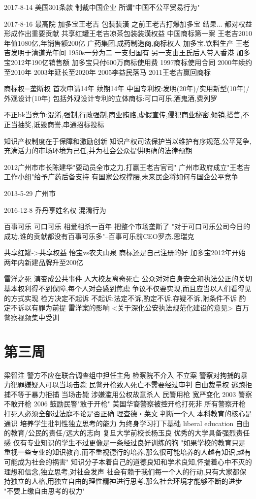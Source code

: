 \documentclass{article}
\begin{document}
\begin{CJK*}{UTF8}{gbsn}
2017-8-14 美国301条款 制裁中国企业 所谓"中国不公平贸易行为" 

2017-8-16 最高院 加多宝王老吉 包装装潢 之前王老吉打爆加多宝 结果... 都对权益形成作出重要贡献 共享红罐王老吉凉茶包装装潢权益 中国商标第一案 王老吉2010年值1080亿,年销售额200亿 广药集团,成药制造商,商标权人 加多宝,饮料生产 王老吉发明于清道光年间 1950s一分为二 一支归国有 另一支由王氏后人带入香港 加多宝2012年190亿销售额 加多宝只付600万商标使用费 1997商标使用合同 2000年续约至2010年 2003年延长至2020年 2005李益民落马 2011王老吉赢回商标

商标权=垄断权 首次申请14年 续期14年 中国专利权:发明(20年)/实用新型(10年)/外观设计(10年) 包括外观设计专利的立体商标:可口可乐,酒鬼酒,费列罗 

不正bk当竞争:混淆,强制,行政强制,商业贿赂,虚假宣传,侵犯商业秘密,倾销,搭售,不正当抽奖,诋毁商誉,串通招标投标

知识产权制度在于保障和激励创新 知识产权司法保护当以维护有序规范,公平竞争,充满活力的市场环境为己任,并为社会公众提供明确的法律预期

2012广州市市长陈建华"要动员全市之力,打赢王老吉官司" 广州市政府成立"王老吉工作小组"给予广药后备支持 有国家公权撑腰,未来民企将如何与国企公平竞争

2013-5-29 广州市 

2016-12-8 乔丹享姓名权 混淆行为 

百事可乐 可口可乐 相爱相杀一百年 把整个市场垄断了 "对于可口可乐公司今日的成功,谁的贡献都没有百事可乐多"--百事可乐前CEO罗杰.恩瑞克

共享红罐->共享权益 怡宝vs农夫山泉 商标还是自己注册的好 加多宝2012年开始两年内新建品牌升至200亿

雷洋之死 演变成公共事件 人大校友离奇死亡 公众对对自身安全和执法公正的关切 基本权利得不到保障,每个人对会感到焦虑 争议不仅要实现,而且应当以人们看得见的方式实现 检方决定不起诉 不起诉:法定不诉,酌定不诉,存疑不诉,附条件不诉 酌定不诉以有罪为前提 雷洋案的影响 <关于深化公安执法规范化建设的意见> 百万警察视频集中受训 

\section{第三周}

梁智注 警方不应在联合调查组中担任主角 检察院不介入 不立案 警察对拘捕的暴力犯罪嫌疑人可以当场击毙 民警开枪致人死亡不需要经过审判 自由裁量权 逃跑拒捕不等于暴力拒捕 当场击毙 涉嫌滥用公权故意杀人 民警用枪 宽严变化 2003 警察不敢开枪 2006 鼓励民警"敢于开枪" 美国华裔警察被控开枪打死非 所有警察开枪打死人必须全部过法庭不论是否正确 理查德・莱文 判断一个人 本科教育的核心是通识 培养学生批判性独立思考的能力 为终身学习打下基础 liberal education 自由的教育/公民的责任/远大的志向 复旦大学前校长杨玉良 优秀的大学具备强烈责任感 仅有专业知识的学生不过更像是一条经过良好训练的狗 "如果学校的教育只是重视一些专业的知识教育,而不重视德行的培养,那么很可能培养的人越有知识,越有可能成为社会的祸害" 知识分子本着自己的道德良知和学术良知,怀揣着心中不灭的理想和信念,独立思考,对社会发声 社会有赖于我们每一个人的行动,只有大家都保持独立的人格,用独立自由的理性精神进行思考,那么社会环境才能够不断的进步 "不要上缴自由思考的权力"


\end{CJK*}
\end{document}

